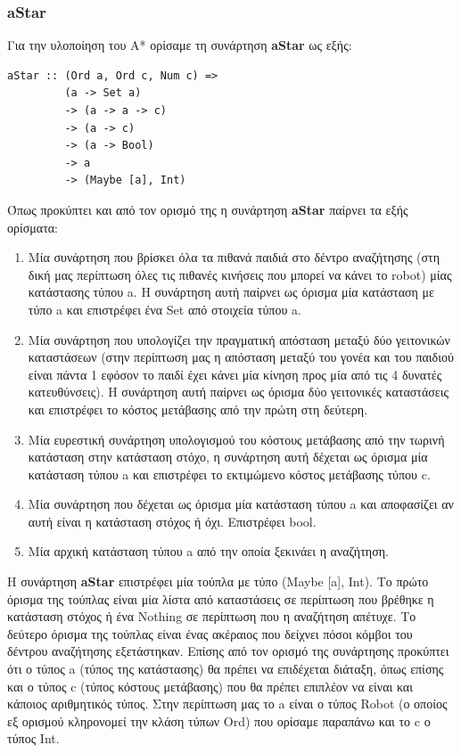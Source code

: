 \documentclass[12pt]{article}
\begin{document}
\subsubsection{aStar}
Για την υλοποίηση του A* ορίσαμε τη συνάρτηση \textbf{aStar} ως εξής:
\begin{verbatim}
aStar :: (Ord a, Ord c, Num c) =>
         (a -> Set a)     
         -> (a -> a -> c) 
         -> (a -> c)      
         -> (a -> Bool)  
         -> a             
         -> (Maybe [a], Int)  
\end{verbatim}
Όπως προκύπτει και από τον ορισμό της η συνάρτηση \textbf{aStar} παίρνει τα εξής ορίσματα:
\begin{enumerate}
\item Mία συνάρτηση που βρίσκει όλα τα πιθανά παιδιά στο δέντρο αναζήτησης (στη δική μας περίπτωση όλες τις πιθανές κινήσεις που μπορεί να κάνει το robot) μίας κατάστασης τύπου a. Η συνάρτηση αυτή παίρνει ως όρισμα μία κατάσταση με τύπο a και επιστρέφει ένα Set από στοιχεία τύπου a.
\item Μία συνάρτηση που υπολογίζει την πραγματική απόσταση μεταξύ δύο γειτονικών καταστάσεων (στην περίπτωση μας η απόσταση μεταξύ του γονέα και του παιδιού είναι πάντα 1 εφόσον το παιδί έχει κάνει μία κίνηση προς μία από τις 4 δυνατές κατευθύνσεις). Η συνάρτηση αυτή παίρνει ως όρισμα δύο γειτονικές καταστάσεις και επιστρέφει το κόστος μετάβασης από την πρώτη στη δεύτερη.
\item Μία ευρεστική συνάρτηση  υπολογισμού του κόστους μετάβασης από την τωρινή κατάσταση στην κατάσταση στόχο, η συνάρτηση αυτή δέχεται ως όρισμα μία κατάσταση τύπου a και επιστρέφει το εκτιμώμενο κόστος μετάβασης τύπου c.
\item Μία συνάρτηση που δέχεται ως όρισμα μία κατάσταση τύπου a και αποφασίζει αν αυτή είναι η κατάσταση στόχος ή όχι. Επιστρέφει bool.
\item Μία αρχική κατάσταση τύπου a από την οποία ξεκινάει η αναζήτηση.
\end{enumerate}
Η συνάρτηση \textbf{aStar} επιστρέφει μία τούπλα με τύπο (Maybe [a], Int). Το πρώτο όρισμα της τούπλας είναι μία λίστα από καταστάσεις σε περίπτωση που βρέθηκε η κατάσταση στόχος ή ένα Nothing σε περίπτωση που η αναζήτηση απέτυχε. Το δεύτερο όρισμα της τούπλας είναι ένας ακέραιος που δείχνει πόσοι κόμβοι του δέντρου αναζήτησης εξετάστηκαν. 
Επίσης από τον ορισμό της συνάρτησης προκύπτει ότι ο τύπος a (τύπος της κατάστασης) θα πρέπει να επιδέχεται διάταξη, όπως επίσης και ο τύπος c (τύπος κόστους μετάβασης) που θα πρέπει επιπλέον να είναι και κάποιος αριθμητικός τύπος.
Στην περίπτωση μας το a είναι ο τύπος Robot (ο οποίος εξ ορισμού κληρονομεί την κλάση τύπων Ord) που ορίσαμε παραπάνω και το c ο τύπος Int.
\end{document}
